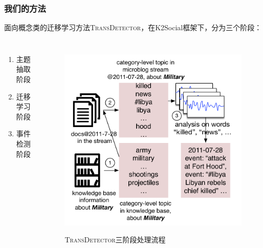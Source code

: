 \begin{frame}
\frametitle{我们的方法}
面向概念类的迁移学习方法\textsc{TransDetector}，在K2Social框架下，分为三个阶段：
\vspace{-6mm}
\begin{columns}[t]
\begin{enumerate}
	\item 主题抽取阶段 \\
	\item 迁移学习阶段 \\
	\item 事件检测阶段
\end{enumerate}

\begin{figure}[h]
		\setlength{\abovecaptionskip}{-4mm}
        \setlength{\belowcaptionskip}{0.cm}
        \centering
		\caption{\textsc{TransDetector}三阶段处理流程}
        \includegraphics[width=0.7\columnwidth]{img/NSDetectorExample.pdf}
        \label{fig:hood}
\end{figure}
\end{columns}

\end{frame}


